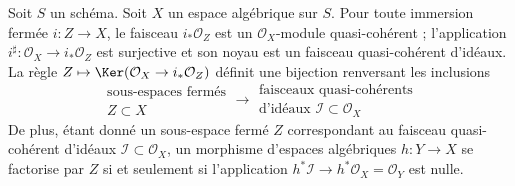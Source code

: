 \begin{lemma}
\label{lemma-closed-immersion-ideals}
Soit $S$ un schéma.
Soit $X$ un espace algébrique sur $S$.
Pour toute immersion fermée $i : Z \to X$, le faisceau
$i_*\mathcal{O}_Z$ est un $\mathcal{O}_X$-module quasi-cohérent ; l'application
$i^\sharp : \mathcal{O}_X \to i_*\mathcal{O}_Z$ est surjective et son
noyau est un faisceau quasi-cohérent d'idéaux. La règle
$Z \mapsto \Ker(\mathcal{O}_X \to i_*\mathcal{O}_Z)$
définit une bijection renversant les inclusions
$$
\begin{matrix}
\text{sous-espaces fermés}\\
Z \subset X
\end{matrix}
\longrightarrow
\begin{matrix}
\text{faisceaux quasi-cohérents}\\
\text{d'idéaux }\mathcal{I} \subset \mathcal{O}_X
\end{matrix}
$$
De plus, étant donné un sous-espace fermé $Z$ correspondant au faisceau
quasi-cohérent d'idéaux $\mathcal{I} \subset \mathcal{O}_X$, un morphisme d'espaces
algébriques $h : Y \to X$ se factorise par $Z$ si et seulement si l'application
$h^*\mathcal{I} \to h^*\mathcal{O}_X = \mathcal{O}_Y$ est nulle.
\end{lemma}

